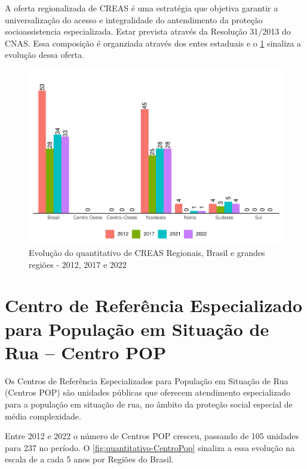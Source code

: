\documentclass[
  brazilian]{report}
\begin{document}
A oferta regionalizada de CREAS é uma estratégia que objetiva garantir a
universalização do acesso e integralidade do antendimento da proteção
socioassistencia especializada. Estar prevista através da Resolução
31/2013 do CNAS. Essa composição é organziada através dos entes
estaduais e o \cref{fig:creas-regionais} sinaliza a evolução dessa
oferta.

\begin{figure}
\includegraphics{Censo-SUAS-2022_files/figure-latex/creas-regionais-1} \caption[Evolução do quantitativo de CREAS Regionais, Brasil e grandes regiões - 2012, 2017 e 2022]{Evolução do quantitativo de CREAS Regionais, Brasil e grandes regiões - 2012, 2017 e 2022}\label{fig:creas-regionais}
\end{figure}

\hypertarget{centro-de-referuxeancia-especializado-para-populauxe7uxe3o-em-situauxe7uxe3o-de-rua-centro-pop}{%
\section{Centro de Referência Especializado para População em Situação
de Rua -- Centro
POP}\label{centro-de-referuxeancia-especializado-para-populauxe7uxe3o-em-situauxe7uxe3o-de-rua-centro-pop}}

Os Centros de Referência Especializados para População em Situação de
Rua (Centros POP) são unidades públicas que oferecem atendimento
especializado para a população em situação de rua, no âmbito da proteção
social especial de média complexidade.

Entre 2012 e 2022 o número de Centros POP cresceu, passando de 105
unidades para 237 no período. O \cref{fig:quantitativo-CentroPop}
sinaliza a essa evolução na escala de a cada 5 anos por Regiões do
Brasil.
\end{document}
